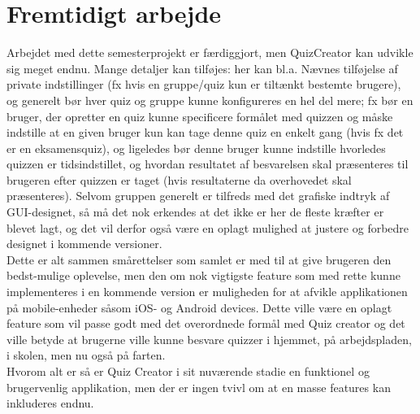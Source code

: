 \chapter{Fremtidigt arbejde}

Arbejdet med dette semesterprojekt er færdiggjort, men QuizCreator kan udvikle sig meget endnu. Mange detaljer kan tilføjes: her kan bl.a. Nævnes tilføjelse af private indstillinger (fx hvis en gruppe/quiz kun er tiltænkt bestemte brugere), og generelt bør hver quiz og gruppe kunne konfigureres en hel del mere; fx bør en bruger, der opretter en quiz kunne specificere formålet med quizzen og måske indstille at en given bruger kun kan tage denne quiz en enkelt gang (hvis fx det er en eksamensquiz), og ligeledes bør denne bruger kunne indstille hvorledes quizzen er tidsindstillet, og hvordan resultatet af besvarelsen skal præsenteres til brugeren efter quizzen er taget (hvis resultaterne da overhovedet skal præsenteres). Selvom gruppen generelt er tilfreds med det grafiske indtryk af GUI-designet, så må det nok erkendes at det ikke er her de fleste kræfter er blevet lagt, og det vil derfor også være en oplagt mulighed at justere og forbedre designet i kommende versioner. \\
Dette er alt sammen smårettelser som samlet er med til at give brugeren den bedst-mulige oplevelse, men den om nok vigtigste feature som med rette kunne implementeres i en kommende version er muligheden for at afvikle applikationen på mobile-enheder såsom iOS- og Android devices. Dette ville være en oplagt feature som vil passe godt med det overordnede formål med Quiz creator og det ville betyde at brugerne ville kunne besvare quizzer i hjemmet, på arbejdspladen, i skolen, men nu også på farten. \\
Hvorom alt er så er Quiz Creator i sit nuværende stadie en funktionel og brugervenlig applikation, men der er ingen tvivl om at en masse features kan inkluderes endnu.
